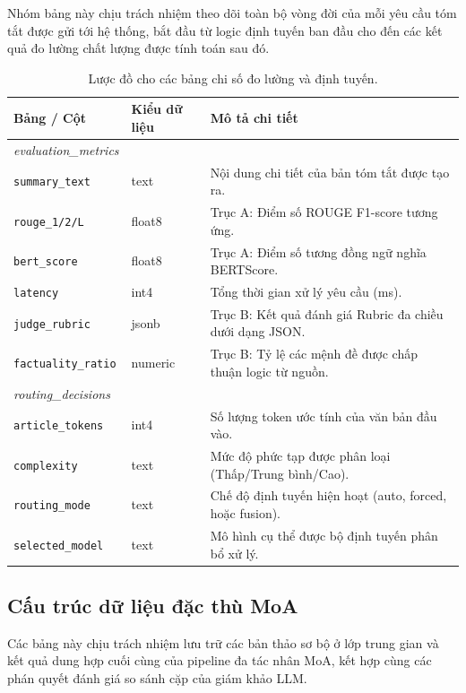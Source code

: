 Nhóm bảng này chịu trách nhiệm theo dõi toàn bộ vòng đời của mỗi yêu cầu tóm tắt được gửi tới hệ thống, bắt đầu từ logic định tuyến ban đầu cho đến các kết quả đo lường chất lượng được tính toán sau đó.

\begin{table}[H]
\centering
\caption{Lược đồ cho các bảng chi số đo lường và định tuyến.}
\begin{tabularx}{\linewidth}{llX}
\hline
\textbf{Bảng / Cột} & \textbf{Kiểu dữ liệu} & \textbf{Mô tả chi tiết} \\ \hline
\textit{evaluation\_metrics} & & \\
\texttt{summary\_text} & text & Nội dung chi tiết của bản tóm tắt được tạo ra. \\
\texttt{rouge\_1/2/L} & float8 & Trục A: Điểm số ROUGE F1-score tương ứng. \\
\texttt{bert\_score} & float8 & Trục A: Điểm số tương đồng ngữ nghĩa BERTScore. \\
\texttt{latency} & int4 & Tổng thời gian xử lý yêu cầu (ms). \\
\texttt{judge\_rubric} & jsonb & Trục B: Kết quả đánh giá Rubric đa chiều dưới dạng JSON. \\
\texttt{factuality\_ratio} & numeric & Trục B: Tỷ lệ các mệnh đề được chấp thuận logic từ nguồn. \\ \hline
\textit{routing\_decisions} & & \\
\texttt{article\_tokens} & int4 & Số lượng token ước tính của văn bản đầu vào. \\
\texttt{complexity} & text & Mức độ phức tạp được phân loại (Thấp/Trung bình/Cao). \\
\texttt{routing\_mode} & text & Chế độ định tuyến hiện hoạt (auto, forced, hoặc fusion). \\
\texttt{selected\_model} & text & Mô hình cụ thể được bộ định tuyến phân bổ xử lý. \\ \hline
\end{tabularx}
\end{table}

\subsection{Cấu trúc dữ liệu đặc thù MoA}

Các bảng này chịu trách nhiệm lưu trữ các bản thảo sơ bộ ở lớp trung gian và kết quả dung hợp cuối cùng của pipeline đa tác nhân MoA, kết hợp cùng các phán quyết đánh giá so sánh cặp của giám khảo LLM.

